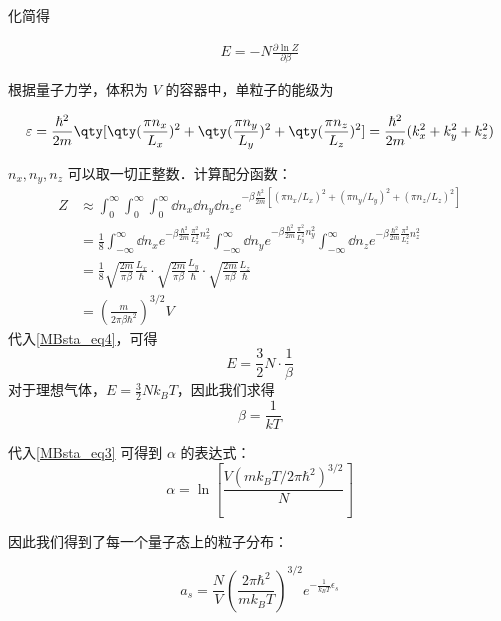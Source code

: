化简得

\begin{equation}\label{MBsta_eq4}
\begin{aligned}
E=-N\frac{\partial \ln Z}{\partial \beta}
\end{aligned}
\end{equation}

根据量子力学，体积为 $V$ 的容器中，单粒子的能级为

\begin{equation}
\varepsilon = \frac{\hbar ^2}{2m} \qty[\qty(\frac{\pi n_x}{L_x})^2 + \qty(\frac{\pi n_y}{L_y})^2 + \qty(\frac{\pi n_z}{L_z})^2] = \frac{\hbar ^2}{2m} (k_x^2 + k_y^2 + k_z^2)
\end{equation}

$n_x,n_y,n_z$ 可以取一切正整数．计算配分函数：
\begin{equation}
\begin{aligned}
Z&\approx \int_{0}^\infty\int_{0}^\infty\int_{0}^\infty\dd n_x\dd n_y\dd n_z  e^{-\beta \frac{\hbar^2}{2m}[(\pi n_x/L_x)^2+(\pi n_y/L_y)^2+(\pi n_z/L_z)^2]}\\
&=\frac{1}{8}\int_{-\infty}^{\infty}\dd n_x e^{-\beta \frac{\hbar^2}{2m}\frac{\pi^2}{L_x^2}n_x^2}\int_{-\infty}^{\infty}\dd n_y e^{-\beta \frac{\hbar^2}{2m}\frac{\pi^2}{L_y^2}n_y^2}\int_{-\infty}^{\infty}\dd n_z e^{-\beta \frac{\hbar^2}{2m}\frac{\pi^2}{L_z^2}n_z^2}
\\
&=\frac{1}{8}\sqrt{\frac{2m}{\pi\beta}}\frac{L_x}{\hbar}\cdot \sqrt{\frac{2m}{\pi\beta}}\frac{L_y}{\hbar} \cdot \sqrt{\frac{2m}{\pi\beta}}\frac{L_z}{\hbar}
\\
&=\left(\frac{m}{2\pi\beta\hbar^2}\right)^{3/2}V
\end{aligned}
\end{equation}
代入\autoref{MBsta_eq4}，可得
\begin{equation}
E=\frac{3}{2}N\cdot \frac{1}{\beta}
\end{equation}
对于理想气体，$E=\frac{3}{2}N k_B T$，因此我们求得
\begin{equation}
\beta=\frac{1}{kT}
\end{equation}

代入\autoref{MBsta_eq3} 可得到 $\alpha$ 的表达式：
\begin{equation}
\alpha=\ln\left[\frac{V(m k_B T/2\pi \hbar^2)^{3/2}}{N}\right]
\end{equation}

因此我们得到了每一个量子态上的粒子分布：

\begin{equation}
a_s=\frac{N}{V}\left(\frac{2\pi \hbar^2}{m k_B T}\right)^{3/2} e^{-\frac{1}{k_B T}\epsilon_s}
\end{equation}

